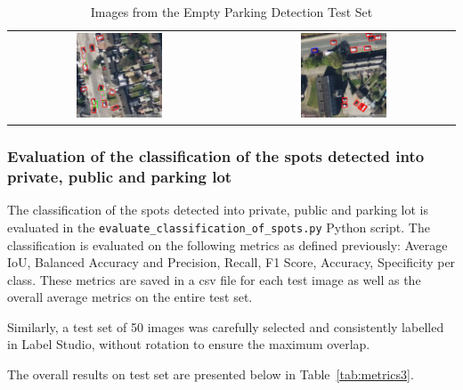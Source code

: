 \begin{table}[htbp]
\begin{tabular}{cc}
    \includegraphics[width=0.4\textwidth]{images/image5_empty_parking_detection_test_set.png} & \includegraphics[width=0.4\textwidth]{images/image6_empty_parking_detection_test_set.png} \\
  \end{tabular}
  \caption{Images from the Empty Parking Detection Test Set}
  \label{tab:test_images2}
\end{table}

\newpage{}

\subsubsection{Evaluation of the classification of the spots detected into private, public and parking lot}
The classification of the spots detected into private, public and parking lot is evaluated in the \texttt{evaluate\_classification\_of\_spots.py} Python script.
The classification is evaluated on the following metrics as defined previously: Average IoU, Balanced Accuracy and Precision, Recall, F1 Score, Accuracy, Specificity per class. These metrics are saved in a csv file for each test image as well as the overall average metrics on the entire test set.

Similarly, a test set of 50 images was carefully selected and consistently labelled in Label Studio, without rotation to ensure the maximum overlap.

The overall results on test set are presented below in Table~\ref{tab:metrics3}.

